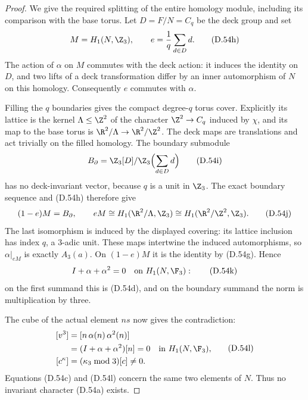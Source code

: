 \begin{proof}
We give the required splitting of
the entire homology module, including
its comparison with the base torus.
Let $D=F/N=C_q$ be the deck group and set
\[
          M=H_1(N,\Z_3),\qquad
                       e=\frac1q\sum_{d\in D}d .
                                                               \tag{D.54h}
\]
The action of $\alpha$ on $M$ commutes
with the deck action: it induces the
identity on $D$, and two lifts of a
deck transformation differ by an inner
automorphism of $N$ on this homology.
Consequently $e$ commutes with $\alpha$.

Filling the $q$ boundaries gives the
compact degree-$q$ torus cover.
Explicitly its lattice is the kernel
$\Lambda\leq\Z^2$ of the character
$\Z^2\to C_q$ induced by $\chi$,
and its map to the base torus is
$\R^2/\Lambda\to\R^2/\Z^2$.
The deck maps are translations and
act trivially on the filled homology.
The boundary submodule
\[
              B_\partial
                =\Z_3[D]/\Z_3\Bigl(\sum_{d\in D}d\Bigr)
                                                               \tag{D.54i}
\]
has no deck-invariant vector, because
$q$ is a unit in $\Z_3$.
The exact boundary sequence and (D.54h)
therefore give
\[
             (1-e)M=B_\partial,\qquad
             eM\cong H_1(\R^2/\Lambda,\Z_3)
                         \cong H_1(\R^2/\Z^2,\Z_3).
                                                               \tag{D.54j}
\]
The last isomorphism is induced by the
displayed covering: its lattice inclusion
has index $q$, a $3$-adic unit.
These maps intertwine the induced
automorphisms, so $\alpha|_{eM}$ is
exactly $A_3(a)$.
On $(1-e)M$ it is the identity by
(D.54g). Hence
\[
                  I+\alpha+\alpha^2=0
                       \quad\text{on }H_1(N,\F_3):
                                                               \tag{D.54k}
\]
on the first summand this is (D.54d),
and on the boundary summand the norm
is multiplication by three.

The cube of the actual element $ns$
now gives the contradiction:
\[
 \begin{split}
  [v^3]
      &=[n\,\alpha(n)\,\alpha^2(n)]\\
      &=(I+\alpha+\alpha^2)[n]=0
                       \quad\text{in }H_1(N,\F_3),\\
  [c^\kappa]&=(\kappa_3\bmod3)[c]\ne0 .
 \end{split}                                             \tag{D.54l}
\]
Equations (D.54c) and (D.54l) concern
the same two elements of $N$.
Thus no invariant character (D.54a)
exists.


\end{proof}

